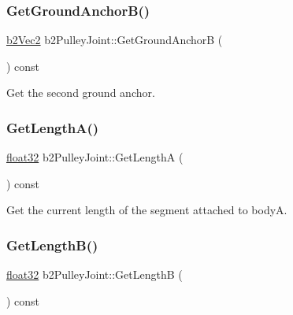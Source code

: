 \mbox{\label{classb2_pulley_joint_afb105270ab46c3fc3f862cab6e127971}} 
\subsubsection{\texorpdfstring{GetGroundAnchorB()}{GetGroundAnchorB()}}
{\footnotesize\ttfamily \mbox{\hyperlink{structb2_vec2}{b2\+Vec2}} b2\+Pulley\+Joint\+::\+Get\+Ground\+AnchorB (\begin{DoxyParamCaption}{ }\end{DoxyParamCaption}) const}



Get the second ground anchor. 

\mbox{\label{classb2_pulley_joint_ac92d5def8d6d14777b255cbeea6b9c30}} 
\subsubsection{\texorpdfstring{GetLengthA()}{GetLengthA()}}
{\footnotesize\ttfamily \mbox{\hyperlink{b2_settings_8h_aacdc525d6f7bddb3ae95d5c311bd06a1}{float32}} b2\+Pulley\+Joint\+::\+Get\+LengthA (\begin{DoxyParamCaption}{ }\end{DoxyParamCaption}) const}



Get the current length of the segment attached to bodyA. 

\mbox{\label{classb2_pulley_joint_a8558201dc81ba177f040ec7e12d78c8d}} 
\subsubsection{\texorpdfstring{GetLengthB()}{GetLengthB()}}
{\footnotesize\ttfamily \mbox{\hyperlink{b2_settings_8h_aacdc525d6f7bddb3ae95d5c311bd06a1}{float32}} b2\+Pulley\+Joint\+::\+Get\+LengthB (\begin{DoxyParamCaption}{ }\end{DoxyParamCaption}) const}




